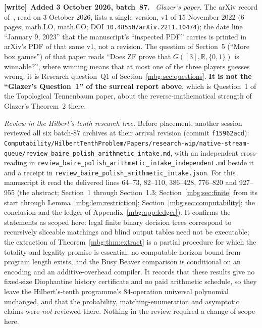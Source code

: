 \documentclass[11pt,letterpaper]{article}
\theoremstyle{definition}
\newenvironment{writenote}[1][]{\par\smallskip\begingroup\small
 \noindent\textbf{[write]}\if\relax\detokenize{#1}\relax\else~\textbf{#1.}\fi\ }%
 {\par\endgroup\smallskip}
\begin{document}
\begin{writenote}[Added 3 October 2026, batch~87]
\emph{Glazer's paper.} The arXiv record of~\cite{GlazerBox}, read on 3 October 2026, lists a single version, v1 of 15 November 2022 (6 pages; math.LO, math.CO; DOI \nolinkurl{10.48550/arXiv.2211.10474}); the date line ``January 9, 2023'' that the manuscript's ``inspected PDF'' carries is printed in arXiv's PDF of that same v1, not a revision. The question of Section~5 (``More box games'') of that paper reads ``Does ZF prove that $G([3],\mathbb R,\{0,1\})$ is winnable?'', where winning means that at most one of the three players guesses wrong; it is Research question~Q1 of Section~\ref{mbg:sec:questions}. \textbf{It is not the ``Glazer's Question~1'' of the surreal report above}, which is Question~1 of the Topological Tennenbaum paper, about the reverse-mathematical strength of Glazer's Theorem~2 there.

\emph{Review in the Hilbert's-tenth research tree.} Before placement, another session reviewed all six batch-87 archives at their arrival revision (commit \texttt{f15962acd}): \nolinkurl{Computability/HilbertTenthProblem/Papers/research-wip/native-stream-queue/review_baire_polish_arithmetic_intake.md}, with an independent cross-reading in \nolinkurl{review_baire_polish_arithmetic_intake_independent.md} beside it and a receipt in \nolinkurl{review_baire_polish_arithmetic_intake.json}. For this manuscript it read the delivered lines 64--73, 82--110, 386--428, 776--820 and 927--955 (the abstract; Section~1 through Section~1.3; Section~\ref{mbg:sec:finite} from its start through Lemma~\ref{mbg:lem:restriction}; Section~\ref{mbg:sec:computability}; the conclusion and the ledger of Appendix~\ref{mbg:app:ledger}). It confirms the statements as scoped here: legal finite binary decision trees correspond to recursively sliceable matchings and blind output tables need not be executable; the extraction of Theorem~\ref{mbg:thm:extract} is a partial procedure for which the totality and legality promise is essential; no computable horizon bound from program length exists, and the Busy Beaver comparison is conditional on an encoding and an additive-overhead compiler. It records that these results give no fixed-size Diophantine history certificate and no paid arithmetic schedule, so they leave the Hilbert's-tenth programme's 84-operation universal polynomial unchanged, and that the probability, matching-enumeration and asymptotic claims were \emph{not} reviewed there. Nothing in the review required a change of scope here.


\end{writenote}
\end{document}
